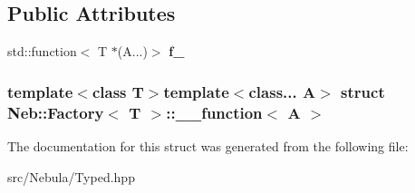 \subsection*{\-Public \-Attributes}
\begin{DoxyCompactItemize}
\item 
\hypertarget{structNeb_1_1Factory_1_1____function_ac9c1e99bc488cc13d5aee742724b1941}{std\-::function$<$ \-T $\ast$(\-A...)$>$ {\bfseries f\-\_\-}}\label{structNeb_1_1Factory_1_1____function_ac9c1e99bc488cc13d5aee742724b1941}

\end{DoxyCompactItemize}
\subsubsection*{template$<$class T$>$template$<$class... \-A$>$ struct Neb\-::\-Factory$<$ T $>$\-::\-\_\-\-\_\-function$<$ A $>$}



\-The documentation for this struct was generated from the following file\-:\begin{DoxyCompactItemize}
\item 
src/\-Nebula/\-Typed.\-hpp\end{DoxyCompactItemize}
